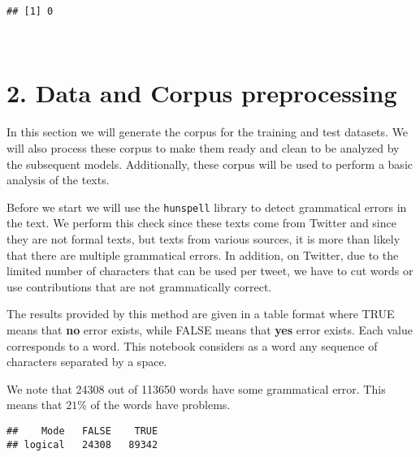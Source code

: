 \documentclass[
]{article}
\newenvironment{Shaded}{\begin{snugshade}}{\end{snugshade}}
\newcommand{\AttributeTok}[1]{\textcolor[rgb]{0.77,0.63,0.00}{#1}}
\newcommand{\CommentTok}[1]{\textcolor[rgb]{0.56,0.35,0.01}{\textit{#1}}}
\newcommand{\FunctionTok}[1]{\textcolor[rgb]{0.00,0.00,0.00}{#1}}
\newcommand{\NormalTok}[1]{#1}
\newcommand{\SpecialCharTok}[1]{\textcolor[rgb]{0.00,0.00,0.00}{#1}}
\newcommand{\StringTok}[1]{\textcolor[rgb]{0.31,0.60,0.02}{#1}}
\begin{document}
\begin{verbatim}
## [1] 0
\end{verbatim}

~

\hypertarget{data-and-corpus-preprocessing}{%
\section{2. Data and Corpus
preprocessing}\label{data-and-corpus-preprocessing}}

In this section we will generate the corpus for the training and test
datasets. We will also process these corpus to make them ready and clean
to be analyzed by the subsequent models. Additionally, these corpus will
be used to perform a basic analysis of the texts.

Before we start we will use the \texttt{hunspell} library to detect
grammatical errors in the text. We perform this check since these texts
come from Twitter and since they are not formal texts, but texts from
various sources, it is more than likely that there are multiple
grammatical errors. In addition, on Twitter, due to the limited number
of characters that can be used per tweet, we have to cut words or use
contributions that are not grammatically correct.

The results provided by this method are given in a table format where
TRUE means that \textbf{no} error exists, while FALSE means that
\textbf{yes} error exists. Each value corresponds to a word. This
notebook considers as a word any sequence of characters separated by a
space.

We note that 24308 out of 113650 words have some grammatical error. This
means that \(21\%\) of the words have problems.

\begin{Shaded}
\end{Shaded}

\begin{verbatim}
##    Mode   FALSE    TRUE 
## logical   24308   89342
\end{verbatim}
\end{document}
